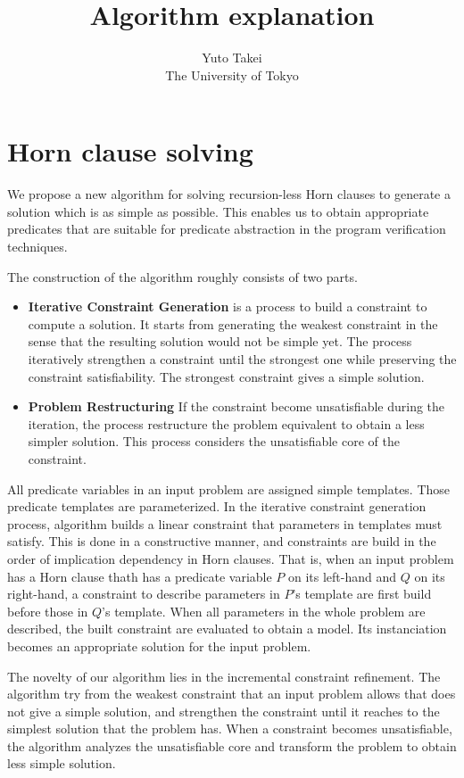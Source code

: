 \documentclass[a4paper,12pt]{article}
\title{Algorithm explanation}
\author{Yuto Takei \\ The University of Tokyo}
\begin{document}
\section{Horn clause solving}

We propose a new algorithm for solving recursion-less Horn clauses to
generate a solution which is as simple as possible.  This enables us
to obtain appropriate predicates that are suitable for predicate
abstraction in the program verification techniques.

The construction of the algorithm roughly consists of two parts.
\begin{itemize}
\item \textbf{Iterative Constraint Generation} is a process to build a
  constraint to compute a solution.  It starts from generating the
  weakest constraint in the sense that the resulting solution would
  not be simple yet.  The process iteratively strengthen a constraint
  until the strongest one while preserving the constraint
  satisfiability.  The strongest constraint gives a simple solution.
\item \textbf{Problem Restructuring} If the constraint become
  unsatisfiable during the iteration, the process restructure the
  problem equivalent to obtain a less simpler solution.  This process
  considers the unsatisfiable core of the constraint.
\end{itemize}

All predicate variables in an input problem are assigned simple
templates.  Those predicate templates are parameterized.  In the
iterative constraint generation process, algorithm builds a linear
constraint that parameters in templates must satisfy.  This is done in
a constructive manner, and constraints are build in the order of
implication dependency in Horn clauses.  That is, when an input
problem has a Horn clause thath has a predicate variable $P$ on its
left-hand and $Q$ on its right-hand, a constraint to describe
parameters in $P$'s template are first build before those in $Q$'s
template.  When all parameters in the whole problem are described, the
built constraint are evaluated to obtain a model.  Its instanciation
becomes an appropriate solution for the input problem.

The novelty of our algorithm lies in the incremental constraint
refinement.  The algorithm try from the weakest constraint that an
input problem allows that does not give a simple solution, and
strengthen the constraint until it reaches to the simplest solution
that the problem has.  When a constraint becomes unsatisfiable, the
algorithm analyzes the unsatisfiable core and transform the problem to
obtain less simple solution.
\end{document}

